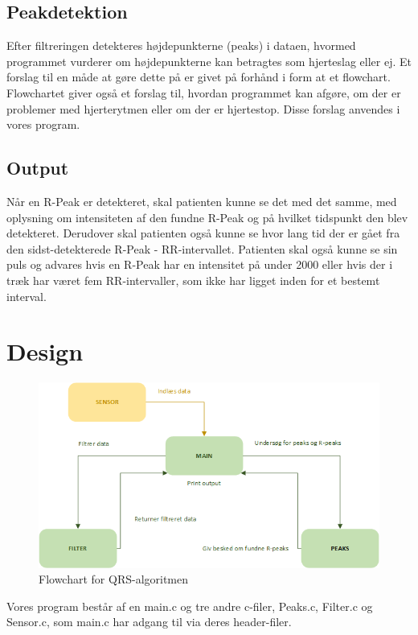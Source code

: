 \documentclass{article}
\begin{document}
\subsection{Peakdetektion}
Efter filtreringen detekteres højdepunkterne (peaks) i dataen, hvormed programmet vurderer om højdepunkterne kan betragtes som hjerteslag eller ej. Et forslag til en måde at gøre dette på er givet på forhånd i form at et flowchart. Flowchartet giver også et forslag til, hvordan programmet kan afgøre, om der er problemer med hjerterytmen eller om der er hjertestop. Disse forslag anvendes i vores program.

\subsection{Output}
Når en R-Peak er detekteret, skal patienten kunne se det med det samme, med oplysning om intensiteten af den fundne R-Peak og på hvilket tidspunkt den blev detekteret. Derudover skal patienten også kunne se hvor lang tid der er gået fra den sidst-detekterede R-Peak - RR-intervallet. Patienten skal også kunne se sin puls og advares hvis en R-Peak har en intensitet på under 2000 eller hvis der i træk har været fem RR-intervaller, som ikke har ligget inden for et bestemt interval.

\section{Design}
\begin{figure}[h]
	\centering
	\includegraphics[scale=0.7]{diagram.png}
	\caption{Flowchart for QRS-algoritmen}
\end{figure}

Vores program består af en main.c og tre andre c-filer, Peaks.c, Filter.c og Sensor.c, som main.c har adgang til via deres header-filer. 
\end{document}
